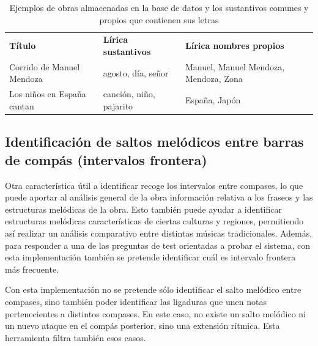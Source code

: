 \begin{table}[H]
\centering
\begin{tabular}{p{3.5cm} p{3.5cm} p{4.5cm}}
\textbf{Título} & \textbf{Lírica sustantivos} & \textbf{Lírica nombres propios} \\
Corrido de Manuel Mendoza & agosto, día, señor & Manuel, Manuel Mendoza, Mendoza, Zona \\
Los niños en España cantan & canción, niño, pajarito & España, Japón \\
\end{tabular}
\caption{Ejemplos de obras almacenadas en la base de datos y los sustantivos comunes y propios que contienen sus letras}
\end{table}

\subsection{Identificación de saltos melódicos entre barras de compás (intervalos frontera)}
Otra característica útil a identificar recoge los intervalos entre compases, lo que puede aportar al análisis general de la obra información relativa a los fraseos y las estructuras melódicas de la obra. Esto también puede ayudar a identificar estructuras melódicas características de ciertas culturas y regiones, permitiendo así realizar un análisis comparativo entre distintas músicas tradicionales. Además, para responder a una de las preguntas de test orientadas a probar el sistema, con esta implementación también se pretende identificar cuál es intervalo frontera más frecuente.

Con esta implementación no se pretende sólo identificar el salto melódico entre compases, sino también poder identificar las ligaduras que unen notas pertenecientes a distintos compases. En este caso, no existe un salto melódico ni un nuevo ataque en el compás posterior, sino una extensión rítmica. Esta herramienta filtra también esos casos.


